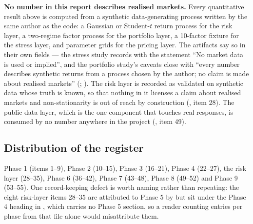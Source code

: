 \documentclass[11pt,a4paper]{article}
\begin{document}
\textbf{No number in this report describes realised markets.} Every quantitative result above
is computed from a synthetic data-generating process written by the same author as the code: a
Gaussian or Student-$t$ return process for the risk layer, a two-regime factor process for the
portfolio layer, a 10-factor fixture for the stress layer, and parameter grids for the pricing
layer. The artifacts say so in their own fields --- the stress study records
 with the statement ``No market data is used or implied'', and
the portfolio study's caveats close with ``every number describes synthetic returns from a
process chosen by the author; no claim is made about realised markets''
(;
).
The risk layer is recorded as validated on synthetic data whose truth is known, so that nothing
in it licenses a claim about realised markets and non-stationarity is out of reach by
construction (, item 28). The public data layer, which is the one
component that touches real responses, is consumed by no number anywhere in the project
(, item 49).

\subsection{Distribution of the register}
Phase 1 (items 1--9), Phase 2 (10--15), Phase 3 (16--21), Phase 4 (22--27), the risk layer
(28--35), Phase 6 (36--42), Phase 7 (43--48), Phase 8 (49--52) and Phase 9 (53--55). One
record-keeping defect is worth naming rather than repeating: the eight risk-layer items 28--35 are
attributed to Phase 5 by  but sit under the
Phase 4 heading in , which carries no Phase 5 section, so a reader
counting entries per phase from that file alone would misattribute them.
\end{document}
